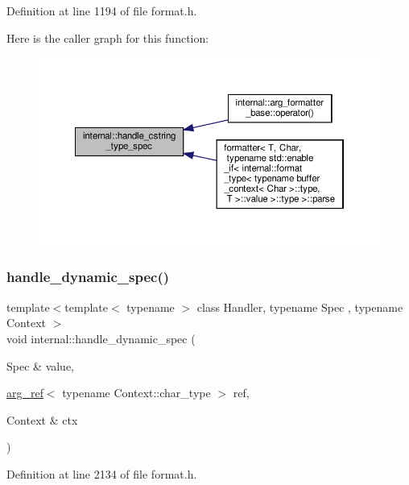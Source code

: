 Definition at line 1194 of file format.\+h.

Here is the caller graph for this function\+:
\nopagebreak
\begin{figure}[H]
\begin{center}
\leavevmode
\includegraphics[width=350pt]{namespaceinternal_aacc088a314117542f56192ea07e12693_icgraph}
\end{center}
\end{figure}
\mbox{\label{namespaceinternal_ad73bcd70ef8d078588a6264dd859e812}} 
\subsubsection{\texorpdfstring{handle\+\_\+dynamic\+\_\+spec()}{handle\_dynamic\_spec()}}
{\footnotesize\ttfamily template$<$template$<$ typename $>$ class Handler, typename Spec , typename Context $>$ \\
void internal\+::handle\+\_\+dynamic\+\_\+spec (\begin{DoxyParamCaption}\item[{Spec \&}]{value,  }\item[{\hyperlink{structinternal_1_1arg__ref}{arg\+\_\+ref}$<$ typename Context\+::char\+\_\+type $>$}]{ref,  }\item[{Context \&}]{ctx }\end{DoxyParamCaption})}



Definition at line 2134 of file format.\+h.

\mbox{\label{namespaceinternal_a68abded0076fd30fc64b6cd044b15b64}} 
